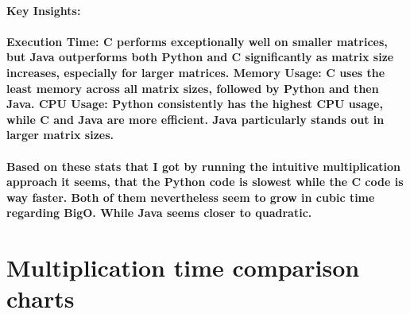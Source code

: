 \documentclass{article}
\begin{document}
\hfill 
\newline
\hfill 
\newline



\paragraph{Key Insights:}

\paragraph{
Execution Time: C performs exceptionally well on smaller matrices, but Java outperforms both Python and C significantly as matrix size increases, especially for larger matrices.
Memory Usage: C uses the least memory across all matrix sizes, followed by Python and then Java.
CPU Usage: Python consistently has the highest CPU usage, while C and Java are more efficient. Java particularly stands out in larger matrix sizes.
}

\paragraph{Based on these stats that I got by running the intuitive multiplication approach it seems, that the Python code is slowest while the C code is way faster. Both of them nevertheless seem to grow in cubic time regarding BigO. While Java seems closer to quadratic.}


\section{Multiplication time comparison charts}

\end{document}
